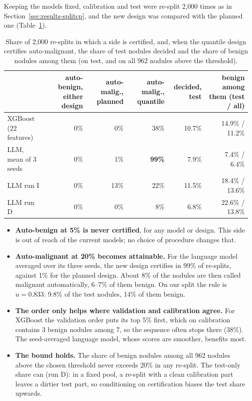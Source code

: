 Keeping the models fixed, calibration and test were re-split 2,000 times as in
Section~\ref{sec:results-splitcp}, and the new design was compared with the planned one
(Table~\ref{tab:results-ltt-design}).

\begin{table}[ht]
  \centering
  \small
  \setlength{\tabcolsep}{4pt}
  \caption{Share of 2,000 re-splits in which a side is certified, and, when the quantile design
           certifies auto-malignant, the share of test nodules decided and the share of benign
           nodules among them (on test, and on all 962 nodules above the threshold).}
  \label{tab:results-ltt-design}
  \begin{tabular}{lrrrrr}
    \toprule
    & \multicolumn{1}{p{1.5cm}}{\raggedleft auto-benign, either design}
    & \multicolumn{1}{p{1.6cm}}{\raggedleft auto-malig., planned}
    & \multicolumn{1}{p{1.6cm}}{\raggedleft auto-malig., quantile}
    & \multicolumn{1}{p{1.4cm}}{\raggedleft decided, test}
    & \multicolumn{1}{p{1.9cm}}{\raggedleft benign among them (test / all)} \\
    \midrule
    XGBoost (22 features) & 0\% & 0\%  & 38\% & 10.7\% & 14.9\% / 11.2\% \\
    LLM, mean of 3 seeds  & 0\% & 1\%  & \textbf{99\%} & 7.9\% & 7.4\% / 6.4\% \\
    LLM run I             & 0\% & 13\% & 22\% & 11.5\% & 18.4\% / 13.6\% \\
    LLM run D             & 0\% & 0\%  & 8\%  & 6.8\%  & 22.6\% / 13.8\% \\
    \bottomrule
  \end{tabular}
\end{table}

\begin{itemize}
  \item \textbf{Auto-benign at 5\% is never certified}, for any model or design. This side is out
        of reach of the current models; no choice of procedure changes that.
  \item \textbf{Auto-malignant at 20\% becomes attainable.} For the language model averaged over
        its three seeds, the new design certifies in 99\% of re-splits, against 1\% for the
        planned design. About 8\% of the nodules are then called malignant automatically, 6--7\%
        of them benign. On our split the rule is $u = 0.833$: 9.8\% of the test nodules, 14\% of
        them benign.
  \item \textbf{The order only helps where validation and calibration agree.} For XGBoost the
        validation order puts its top 5\% first, which on calibration contains 3 benign nodules
        among 7, so the sequence often stops there (38\%). The seed-averaged language model, whose
        scores are smoother, benefits most.
  \item \textbf{The bound holds.} The share of benign nodules among all 962 nodules above the
        chosen threshold never exceeds 20\% in any re-split. The test-only share can (run D):
        in a fixed pool, a re-split with a clean calibration part leaves a dirtier test part, so
        conditioning on certification biases the test share upwards.
\end{itemize}

